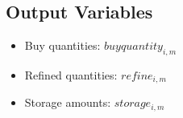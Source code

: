 \documentclass{article}
\begin{document}
\subsection*{Output Variables}
\begin{itemize}
    \item Buy quantities: \( buyquantity_{i,m} \)
    \item Refined quantities: \( refine_{i,m} \)
    \item Storage amounts: \( storage_{i,m} \)
\end{itemize}
\end{document}

